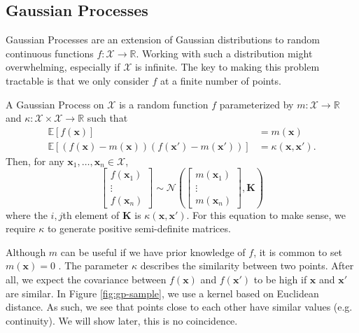 \subsection{Gaussian Processes}

Gaussian Processes are an extension of Gaussian distributions to random continuous functions $f: \mathcal{X} \to \mathbb{R}$.
Working with such a distribution might overwhelming, especially if $\mathcal{X}$ is infinite.
The key to making this problem tractable is that we only consider $f$ at a finite number of points.


\begin{definition}
    A Gaussian Process on $\mathcal{X}$ is a random function $f$ parameterized by
    $m: \mathcal{X} \to \mathbb{R}$ and $\kappa: \mathcal{X} \times \mathcal{X} \to \mathbb{R}$
    such that
    \begin{align*}
        \mathbb{E}[f(\mathbf{x})] &= m(\mathbf{x}) \\
        \mathbb{E}[(f(\mathbf{x}) - m(\mathbf{x}))(f(\mathbf{x}') - m(\mathbf{x}'))] &= \kappa(\mathbf{x}, \mathbf{x}').
    \end{align*}
    Then, for any $\mathbf{x}_1, \ldots,\mathbf{x}_n \in \mathcal{X}$,
    \begin{equation*}
        \begin{bmatrix}
            f(\mathbf{x}_1) \\ \vdots \\ f(\mathbf{x}_n)
        \end{bmatrix} \sim
        \mathcal{N}\left(
        \begin{bmatrix}
            m(\mathbf{x}_1) \\ \vdots \\ m(\mathbf{x}_n)
        \end{bmatrix}, \mathbf{K}\right)
    \end{equation*}
    where the $i,j$th element of $\mathbf{K}$ is $\kappa(\mathbf{x}, \mathbf{x}')$.
    For this equation to make sense, we require $\kappa$ to generate positive semi-definite matrices.
\end{definition}

Although $m$ can be useful if we have prior knowledge of $f$, it is common to set $m(\mathbf{x}) = 0$ \cite{murphy2012}.
The parameter $\kappa$ describes the similarity between two points. After all, we expect the covariance between $f(\mathbf{x})$ and $f(\mathbf{x}')$
to be high if $\mathbf{x}$ and $\mathbf{x}'$ are similar.
In Figure \ref{fig:gp-sample}, we use a kernel based on Euclidean distance.
As such, we see that points close to each other have similar values (e.g. continuity).
We will show later, this is no coincidence.

